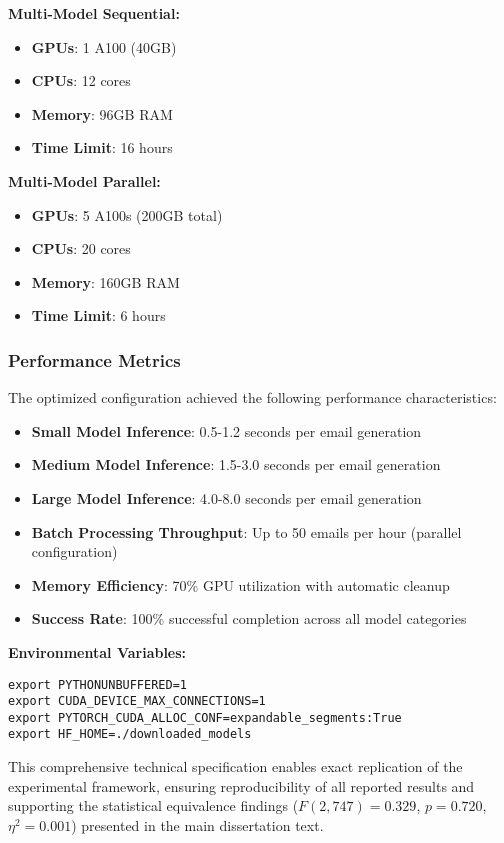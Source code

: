 \textbf{Multi-Model Sequential:}
\begin{itemize}
    \item \textbf{GPUs}: 1 A100 (40GB)
    \item \textbf{CPUs}: 12 cores
    \item \textbf{Memory}: 96GB RAM
    \item \textbf{Time Limit}: 16 hours
\end{itemize}

\textbf{Multi-Model Parallel:}
\begin{itemize}
    \item \textbf{GPUs}: 5 A100s (200GB total)
    \item \textbf{CPUs}: 20 cores
    \item \textbf{Memory}: 160GB RAM
    \item \textbf{Time Limit}: 6 hours
\end{itemize}

\subsubsection{Performance Metrics}

The optimized configuration achieved the following performance characteristics:

\begin{itemize}
    \item \textbf{Small Model Inference}: 0.5-1.2 seconds per email generation
    \item \textbf{Medium Model Inference}: 1.5-3.0 seconds per email generation
    \item \textbf{Large Model Inference}: 4.0-8.0 seconds per email generation
    \item \textbf{Batch Processing Throughput}: Up to 50 emails per hour (parallel configuration)
    \item \textbf{Memory Efficiency}: 70\% GPU utilization with automatic cleanup
    \item \textbf{Success Rate}: 100\% successful completion across all model categories
\end{itemize}

\textbf{Environmental Variables:}
\begin{verbatim}
export PYTHONUNBUFFERED=1
export CUDA_DEVICE_MAX_CONNECTIONS=1
export PYTORCH_CUDA_ALLOC_CONF=expandable_segments:True
export HF_HOME=./downloaded_models
\end{verbatim}

This comprehensive technical specification enables exact replication of the experimental framework, ensuring reproducibility of all reported results and supporting the statistical equivalence findings ($F(2,747) = 0.329$, $p = 0.720$, $\eta^2 = 0.001$) presented in the main dissertation text.

